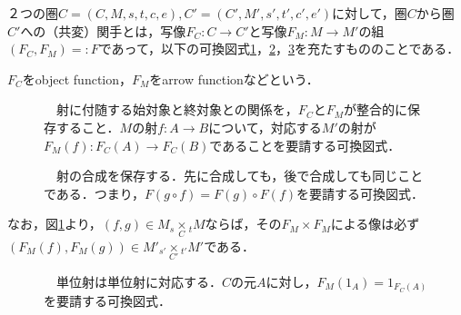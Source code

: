\documentclass[uplatex, 12pt, dvipdfmx]{jsreport}
\begin{document}
\begin{shadebox}\begin{definition}[（共変）関手]
    ２つの圏$C=(C,M,s,t,c,e),C'=(C',M',s',t',c',e')$に対して，圏$C$から圏$C'$への（共変）関手とは，写像$F_C:C\rightarrow C'$と写像$F_M:M\rightarrow M'$の組$(F_C,F_M)=:F$であって，以下の可換図式\ref{cd-5}，\ref{cd-6}，\ref{cd-7}を充たすもののことである．
\end{definition}\end{shadebox}
$F_C$をobject function，$F_M$をarrow functionなどという．

\begin{figure}[ht]\begin{center} \caption{\label{cd-5}　射に付随する始対象と終対象との関係を，$F_C$と$F_M$が整合的に保存すること．$M$の射$f:A\to B$について，対応する$M'$の射が$F_M(f):F_C(A)\to F_C(B)$であることを要請する可換図式．}
\end{center}\end{figure}

\begin{figure}[ht]\begin{center} \caption{\label{cd-6}　射の合成を保存する．先に合成しても，後で合成しても同じことである．つまり，$F(g\circ f)=F(g)\circ F(f)$を要請する可換図式．}
\end{center}\end{figure}
なお，図\ref{cd-5}より，$(f,g)\in M_s\underset{C}{\times}{}_tM$ならば，その$F_M\times F_M$による像は必ず$(F_M(f),F_M(g))\in M'_{s'}\underset{C'}{\times}{}_{t'}M'$である．

\begin{figure}[ht]\begin{center} \caption{\label{cd-7}　単位射は単位射に対応する．$C$の元$A$に対し，$F_M(1_A)=1_{F_C(A)}$を要請する可換図式．}
\end{center}\end{figure}
\end{document}
